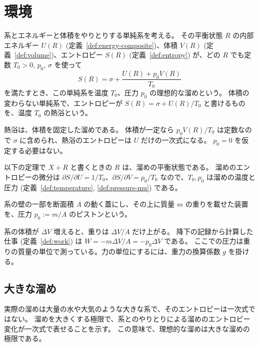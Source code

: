 \section{環境}

\begin{definition}[溜めと熱浴]
  \label{def:reservoir}
  系とエネルギーと体積をやりとりする単純系を考える。
  その平衡状態 $R$ の内部エネルギー $U(R)$ (定義~\ref{def:energy-composite})、体積 $V(R)$ (定義~\ref{def:volume})、エントロピー $S(R)$ (定義~\ref{def:entropy}) が、どの $R$ でも定数 $T_0 > 0$, $p_0$, $\sigma$ を使って
  \[ S(R) = \sigma + \frac{U(R) + p_0 V(R)}{T_0} \]
  を満たすとき、この単純系を温度 $T_0$、圧力 $p_0$ の理想的な溜めという。
  体積の変わらない単純系で、エントロピーが $S(R) = \sigma + U(R)/T_0$ と書けるものを、温度 $T_0$ の熱浴という。
\end{definition}

熱浴は、体積を固定した溜めである。
体積が一定なら $p_0 V(R)/T_0$ は定数なので $\sigma$ に含められ、熱浴のエントロピーは $U$ だけの一次式になる。
$p_0 = 0$ を仮定する必要はない。

以下の定理で $X + R$ と書くときの $R$ は、溜めの平衡状態である。
溜めのエントロピーの微分は $\partial S/\partial U = 1/T_0$、$\partial S/\partial V = p_0/T_0$ なので、$T_0, p_0$ は溜めの温度と圧力 (定義~\ref{def:temperature}, \ref{def:pressure-mu}) である。

\begin{definition}[圧力 $p_0$ のピストン]
  \label{def:piston}
  系の壁の一部を断面積 $A$ の動く蓋にし、その上に質量 $m$ の重りを載せた装置を、圧力 $p_0 := m/A$ のピストンという。
\end{definition}

系の体積が $\Delta V$ 増えると、重りは $\Delta V / A$ だけ上がる。
降下の記録から計算した仕事 (定義~\ref{def:work}) は $W = -m \Delta V / A = -p_0 \Delta V$ である。
ここでの圧力は重りの質量の単位で測っている。力の単位にするには、重力の換算係数 $g$ を掛ける。

\subsection{大きな溜め}
\label{sec:large-reservoir}

実際の溜めは大量の水や大気のような大きな系で、そのエントロピーは一次式ではない。
溜めを大きくする極限で、系とのやりとりによる溜めのエントロピー変化が一次式で表せることを示す。
この意味で、理想的な溜めは大きな溜めの極限である。

